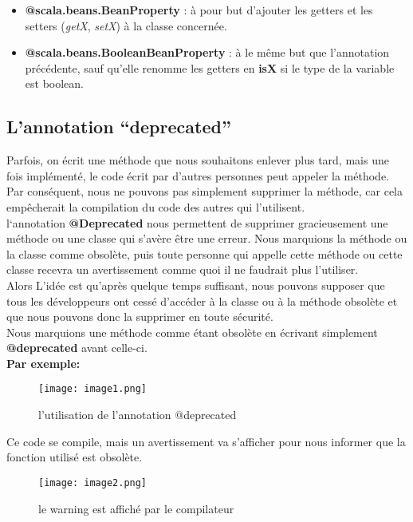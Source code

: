 \documentclass[runningheads]{llncs}
\begin{document}
\begin{itemize}
\item \textbf{@scala.beans.BeanProperty} : à pour but d’ajouter les getters et les setters (\textit{getX}, \textit{setX}) à la classe concernée.
\item \textbf{@scala.beans.BooleanBeanProperty} : à le même but que l’annotation précédente, sauf qu’elle renomme les getters en \textbf{isX} si le type de la variable est boolean.
\end{itemize}


\subsection{L’annotation “deprecated”}
Parfois, on écrit une méthode que nous souhaitons enlever plus tard, mais une fois implémenté, le code écrit par d’autres personnes peut appeler la méthode. Par conséquent, nous ne pouvons pas simplement supprimer la méthode, car cela empêcherait la compilation du code des autres qui l’utilisent.\\

	l‘annotation \textbf{@Deprecated} nous permettent de supprimer gracieusement une méthode ou une classe qui s'avère être une erreur. Nous marquions la méthode ou la classe comme obsolète, puis toute personne qui appelle cette méthode ou cette classe recevra un avertissement comme quoi il ne faudrait plus l'utiliser.\\

Alors L'idée est qu'après quelque temps suffisant, nous pouvons supposer que tous les développeurs ont cessé d'accéder à la classe ou à la méthode obsolète et que nous pouvons donc la supprimer en toute sécurité.\\

	Nous marquions une méthode comme étant obsolète en écrivant simplement \textbf{@deprecated} avant celle-ci. \\

\textbf{Par exemple:}
\begin{figure}
\texttt{[image: image1.png]}
\caption{l'utilisation de l'annotation @deprecated} \label{fig2}
\end{figure}


Ce code se compile, mais un avertissement va s’afficher pour nous informer que la fonction utilisé est obsolète.

\begin{figure}
\texttt{[image: image2.png]}
\caption{le warning est affiché par le compilateur} \label{fig3}
\end{figure}
\end{document}
